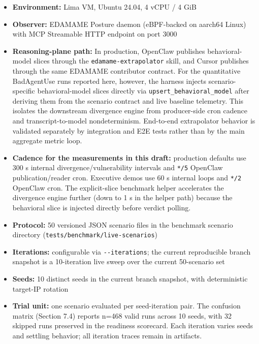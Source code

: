 \documentclass[
]{article}
\providecommand{\tightlist}{%
  \setlength{\itemsep}{0pt}\setlength{\parskip}{0pt}}
\begin{document}
\begin{itemize}
\tightlist
\item
  \textbf{Environment:} Lima VM, Ubuntu 24.04, 4 vCPU / 4 GiB
\item
  \textbf{Observer:} EDAMAME Posture daemon (eBPF-backed on aarch64
  Linux) with MCP Streamable HTTP endpoint on port 3000
\item
  \textbf{Reasoning-plane path:} In production, OpenClaw publishes
  behavioral-model slices through the \texttt{edamame-extrapolator}
  skill, and Cursor publishes through the same EDAMAME contributor
  contract. For the quantitative BadAgentUse runs reported here,
  however, the harness injects scenario-specific behavioral-model slices
  directly via \texttt{upsert\_behavioral\_model} after deriving them
  from the scenario contract and live baseline telemetry. This isolates
  the downstream divergence engine from producer-side cron cadence and
  transcript-to-model nondeterminism. End-to-end extrapolator behavior
  is validated separately by integration and E2E tests rather than by
  the main aggregate metric loop.
\item
  \textbf{Cadence for the measurements in this draft:} production
  defaults use 300 s internal divergence/vulnerability intervals and
  \texttt{*/5} OpenClaw publication/reader cron. Executive demos use 60
  s internal loops and \texttt{*/2} OpenClaw cron. The explicit-slice
  benchmark helper accelerates the divergence engine further (down to 1
  s in the helper path) because the behavioral slice is injected
  directly before verdict polling.
\item
  \textbf{Protocol:} 50 versioned JSON scenario files in the benchmark
  scenario directory (\texttt{tests/benchmark/live-scenarios})
\item
  \textbf{Iterations:} configurable via \texttt{-\/-iterations}; the
  current reproducible branch snapshot is a 10-iteration live sweep over
  the current 50-scenario set
\item
  \textbf{Seeds:} 10 distinct seeds in the current branch snapshot, with
  deterministic target-IP rotation
\item
  \textbf{Trial unit:} one scenario evaluated per seed-iteration pair.
  The confusion matrix (Section 7.4) reports n=468 valid runs across 10
  seeds, with 32 skipped runs preserved in the readiness scorecard. Each
  iteration varies seeds and settling behavior; all iteration traces
  remain in artifacts.
\end{itemize}
\end{document}
